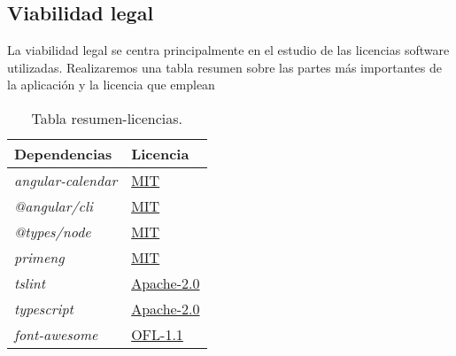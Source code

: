 \subsection{Viabilidad legal}\label{viabilidad-legal}
La viabilidad legal se centra principalmente en el estudio de las licencias software utilizadas. Realizaremos una tabla resumen sobre las partes más importantes de la aplicación y la licencia que emplean

\begin{table}[htbp]
\begin{center}
\begin{tabular}{|l|l|}
\hline
Dependencias & Licencia \\
\hline \hline
\emph{angular-calendar} & \hyperlink{https://opensource.org/licenses/MIT}{MIT}\\ \hline
\emph{@angular/cli} & \hyperlink{https://opensource.org/licenses/MIT}{MIT}\\ \hline
\emph{@types/node} & \hyperlink{https://opensource.org/licenses/MIT}{MIT}\\ \hline
\emph{primeng} & \hyperlink{https://opensource.org/licenses/MIT}{MIT}\\ \hline
\emph{tslint} & \hyperlink{https://opensource.org/licenses/Apache-2.0}{Apache-2.0}\\ \hline
\emph{typescript} & \hyperlink{https://opensource.org/licenses/Apache-2.0}{Apache-2.0}\\ \hline
\emph{font-awesome} & \hyperlink{https://opensource.org/licenses/OFL-1.1}{OFL-1.1}\\ \hline

\end{tabular}
\caption{Tabla resumen-licencias.}
\label{tabla:licencias}
\end{center}
\end{table}


